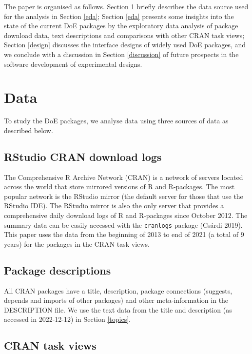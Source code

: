 \documentclass{article}
\begin{document}
The paper is organised as follows. Section \ref{data} briefly describes
the data source used for the analysis in Section \ref{eda}; Section
\ref{eda} presents some insights into the state of the current DoE
packages by the exploratory data analysis of package download data, text
descriptions and comparisons with other CRAN task views; Section
\ref{design} discusses the interface designs of widely used DoE
packages, and we conclude with a discussion in Section \ref{discussion}
of future prospects in the software development of experimental designs.

\hypertarget{data}{%
\section{Data}\label{data}}

To study the DoE packages, we analyse data using three sources of data
as described below.

\hypertarget{rstudio-cran-download-logs}{%
\subsection{RStudio CRAN download
logs}\label{rstudio-cran-download-logs}}

The Comprehensive R Archive Network (CRAN) is a network of servers
located across the world that store mirrored versions of R and
R-packages. The most popular network is the RStudio mirror (the default
server for those that use the RStudio IDE). The RStudio mirror is also
the only server that provides a comprehensive daily download logs of R
and R-packages since October 2012. The summary data can be easily
accessed with the \texttt{cranlogs} package (Csárdi 2019). This paper
uses the data from the beginning of 2013 to end of 2021 (a total of 9
years) for the packages in the CRAN task views.

\hypertarget{package-descriptions}{%
\subsection{Package descriptions}\label{package-descriptions}}

All CRAN packages have a title, description, package connections
(suggests, depends and imports of other packages) and other
meta-information in the DESCRIPTION file. We use the text data from the
title and description (as accessed in 2022-12-12) in Section
\ref{topics}.

\hypertarget{cran-task-views}{%
\subsection{CRAN task views}\label{cran-task-views}}
\end{document}
